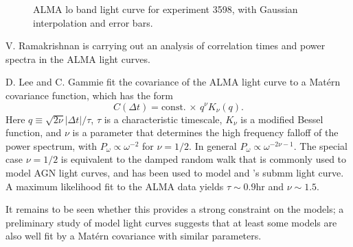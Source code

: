 \documentclass[twocolumn,tighten,dvipsnames,linenumbers]{aastex63}
\begin{document}
\begin{figure}
  \caption{ALMA lo band light curve for experiment 3598, with Gaussian interpolation and error bars.}
  \label{fig:LC3598}
\end{figure}

V. Ramakrishnan is carrying out an analysis of correlation times and power spectra in the ALMA light curves.

D. Lee and C. Gammie fit the covariance of the ALMA light curve to a Mat\'ern covariance function, which has the form
\begin{equation}
  C(\Delta t) = \mbox{const.} \, \times \, q^\nu K_\nu(q).
\end{equation}
Here $q \equiv \sqrt{2\nu} |\Delta t|/\tau$, $\tau$ is a characteristic timescale, $K_\nu$ is a modified Bessel function, and $\nu$ is a parameter that determines the high frequency falloff of the power spectrum, with $P_\omega \propto \omega^{-2}$ for $\nu = 1/2$.  In general $P_\omega \propto \omega^{-2\nu - 1}$. The special case $\nu = 1/2$ is equivalent to the damped random walk that is commonly used to model AGN light curves, and has been used to model \sgra and 's submm light curve. A maximum likelihood fit to the ALMA data yields $\tau \sim 0.9$hr and $\nu \sim 1.5$.

It remains to be seen whether this provides a strong constraint on the models; a preliminary study of model light curves suggests that at least some models are also well fit by a Mat\'ern covariance with similar parameters.
\end{document}
